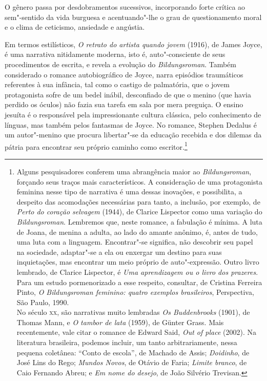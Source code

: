 O gênero passa por desdobramentos sucessivos, incorporando forte crítica
ao sem"-sentido da vida burguesa e acentuando"-lhe o grau de
questionamento moral e o clima de ceticismo, ansiedade e angústia. 

Em termos estilísticos, \textit{O retrato do
artista quando jovem} (1916), de James Joyce, é uma
narrativa nitidamente moderna, isto é, auto"-consciente de seus
procedimentos de escrita, e revela a evolução do
\textit{Bildungsroman}. Também considerado o
romance autobiográfico de Joyce, narra episódios traumáticos referentes
à sua infância, tal como o castigo de palmatória, que o jovem
protagonista sofre de um bedel inábil, desconfiado de que o menino (que
havia perdido os óculos) não fazia sua tarefa em sala por mera
preguiça. O ensino jesuíta é o responsável pela impressionante cultura
clássica, pelo conhecimento de línguas, mas também pelos fantasmas de
Joyce. No romance, Stephen Dedalus é um autor"-menino que procura
libertar"-se da educação recebida e dos dilemas da pátria para
encontrar seu próprio caminho como
escritor.\footnote{Alguns pesquisadores conferem uma abrangência maior ao
\textit{Bildungsroman}, forçando seus traços mais característicos. A consideração de uma
protagonista feminina nesse tipo de narrativa é uma dessas inovações, e
possibilita, a despeito das acomodações necessárias para tanto, a
inclusão, por exemplo, de \textit{Perto do coração selvagem} (1944), de Clarice
Lispector como uma variação do \textit{Bildungsroman}.
Lembremos que, neste romance, a fabulação é mínima. A luta de Joana, de
menina a adulta, ao lado do amante anônimo, é, antes de tudo, uma luta
com a linguagem. Encontrar"-se significa, não descobrir seu papel na
sociedade, adaptar"-se a ela ou enxergar um destino para suas
inquietações, mas encontrar um meio próprio de auto"-expressão. Outro
livro lembrado, de Clarice Lispector, é \textit{Uma aprendizagem ou o livro dos
prazeres}. Para um estudo pormenorizado a esse respeito, consultar, de Cristina Ferreira Pinto,
\textit{O Bildungsroman feminino: quatro exemplos brasileiros}, Perspectiva, São Paulo, 
1990.  \\No século \textsc{xx}, são narrativas muito lembradas
\textit{Os Buddenbrooks} (1901), de Thomas Mann, e \textit{O tambor de
lata} (1959), de Günter Grass. Mais recentemente, vale citar o romance
de Edward Said, \textit{Out of place} (2002). Na literatura brasileira,
podemos incluir, um tanto arbitrariamente, nessa pequena coletânea:
``Conto de escola'', de Machado de Assis; \textit{Doidinho}, de José Lins
do Rego; \textit{Mundos Novos}, de Otávio de Faria; \textit{Limite
branco}, de Caio Fernando Abreu; e \textit{Em nome do desejo}, de João Silvério Trevisan.} 


